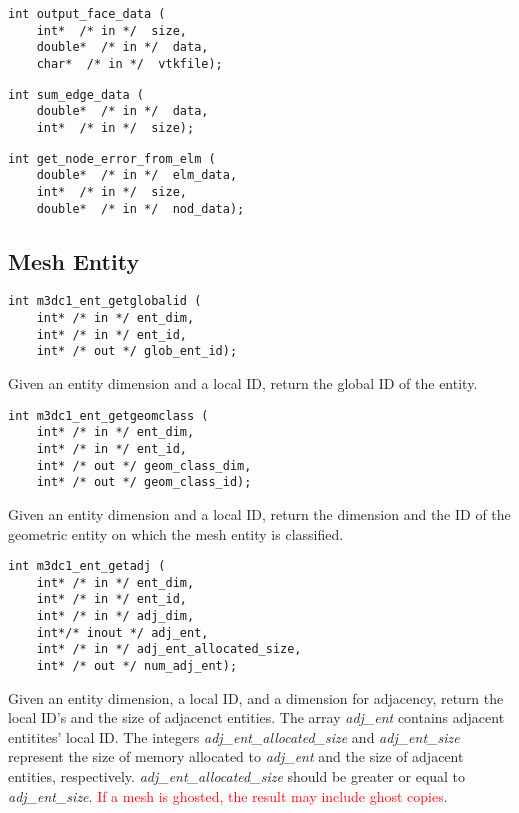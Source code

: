 \begin{verbatim}
int output_face_data (
    int*  /* in */  size, 
    double*  /* in */  data, 
    char*  /* in */  vtkfile);
\end{verbatim}\vspace{-.5cm}\hspace{1cm}

\begin{verbatim}
int sum_edge_data (
    double*  /* in */  data, 
    int*  /* in */  size);
\end{verbatim}\vspace{-.5cm}\hspace{1cm}

\begin{verbatim}
int get_node_error_from_elm (
    double*  /* in */  elm_data, 
    int*  /* in */  size, 
    double*  /* in */  nod_data);
\end{verbatim}\vspace{-.5cm}\hspace{1cm}

\subsection{Mesh Entity}

\begin{verbatim}
int m3dc1_ent_getglobalid (
    int* /* in */ ent_dim, 
    int* /* in */ ent_id, 
    int* /* out */ glob_ent_id); 
\end{verbatim}\vspace{-.5cm}\hspace{1cm}
Given an entity dimension and a local ID, return the global ID of the entity.

\begin{verbatim}
int m3dc1_ent_getgeomclass ( 
    int* /* in */ ent_dim, 
    int* /* in */ ent_id, 
    int* /* out */ geom_class_dim, 
    int* /* out */ geom_class_id); 
\end{verbatim}\vspace{-.5cm}\hspace{1cm}
Given an entity dimension and a local ID, return the dimension and the ID of the geometric entity on which the mesh entity is classified. 

\begin{verbatim}
int m3dc1_ent_getadj (
    int* /* in */ ent_dim, 
    int* /* in */ ent_id, 
    int* /* in */ adj_dim,
    int*/* inout */ adj_ent,
    int* /* in */ adj_ent_allocated_size,
    int* /* out */ num_adj_ent); 
\end{verbatim}\vspace{-.5cm}\hspace{1cm}
Given an entity dimension, a local ID, and a dimension for adjacency, return the local ID's and the size of adjacenct entities. The array \emph{adj\_ent} contains adjacent entitites' local ID. The integers \emph{adj\_ent\_allocated\_size} and \emph{adj\_ent\_size} represent the size of memory allocated to \emph{adj\_ent} and the size of adjacent entities, respectively. \emph{adj\_ent\_allocated\_size} should be greater or equal to \emph{adj\_ent\_size}. \textcolor{red}{If a mesh is ghosted, the result may include ghost copies}.
	      
